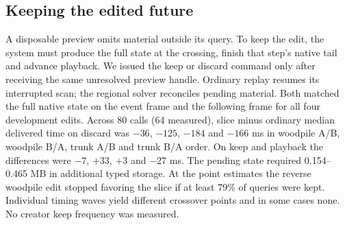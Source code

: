 \subsection{Keeping the edited future}
A disposable preview omits material outside its query. To keep the edit, the system must produce the full state at the crossing, finish that step's native tail and advance playback. We issued the keep or discard command only after receiving the same unresolved preview handle. Ordinary replay resumes its interrupted scan; the regional solver reconciles pending material. Both matched the full native state on the event frame and the following frame for all four development edits.
Across 80 calls (64 measured), slice minus ordinary median delivered time on discard was $-36$, $-125$, $-184$ and $-166$ ms in woodpile A/B, woodpile B/A, trunk A/B and trunk B/A order. On keep and playback the differences were $-7$, $+33$, $+3$ and $-27$ ms. The pending state required 0.154--0.465 MB in additional typed storage. At the point estimates the reverse woodpile edit stopped favoring the slice if at least 79\% of queries were kept. Individual timing waves yield different crossover points and in some cases none. No creator keep frequency was measured.
